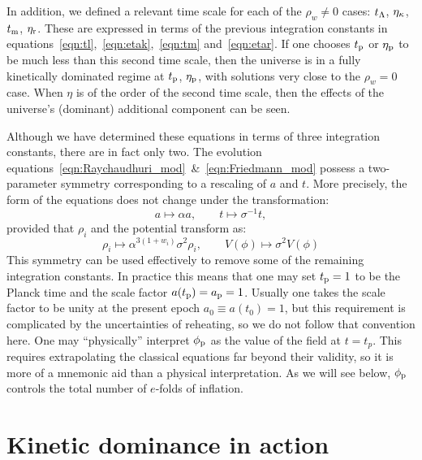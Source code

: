 In addition, we defined a relevant time scale for each of the \(\rho_w \neq 0\) cases: \(t_\mathrm{\Lambda}\), \(\eta_\mathrm{\kappa}\), \(t_{\mathrm{m}}\), \(\eta_{\mathrm{r}}\). These are expressed in terms of the previous integration constants in equations~\eqref{eqn:tl},~\eqref{eqn:etak},~\eqref{eqn:tm} and~\eqref{eqn:etar}. If one chooses \(t_{\mathrm{p}}\) or \(\eta_{\mathrm{p}}\) to be much less than this second time scale, then the universe is in a fully kinetically dominated regime at \(t_{\mathrm{p}}\), \(\eta_{\mathrm{p}}\), with solutions very close to the \(\rho_w=0\) case. When \(\eta\) is of the order of the second time scale, then the effects of the universe's (dominant) additional component can be seen.

Although we have determined these equations in terms of three integration constants, there are in fact only two.  The evolution equations~\eqref{eqn:Raychaudhuri_mod}~\&~\eqref{eqn:Friedmann_mod} possess a two-parameter symmetry corresponding to a rescaling of \(a\) and \(t\). More precisely, the form of the equations does not change under the transformation:
%
\begin{equation}
  a\mapsto\alpha a, 
  \qquad 
  t \mapsto\sigma^{-1}t,
\end{equation}
%
provided that \(\rho_i\) and the potential transform as:
%
\begin{equation}
  \rho_i \mapsto \alpha^{3(1+w_i)}\sigma^2\rho_i, 
  \qquad
  V(\phi) \mapsto \sigma^2 V(\phi)
\end{equation}
%
This symmetry can be used effectively to remove some of the remaining integration constants. In practice this means that one may set \(t_{\mathrm{p}}=1\) to be the Planck time and the scale factor \(a(t_{\mathrm{p}})=a_{\mathrm{p}}=1\). Usually one takes the scale factor to be unity at the present epoch \(a_0\equiv a(t_0)=1\), but this requirement is complicated by the uncertainties of reheating, so we do not follow that convention here. One may ``physically'' interpret \(\phi_{\mathrm{p}}\) as the value of the field at \(t=t_p\).  This requires extrapolating the classical equations far beyond their validity, so it is more of a mnemonic aid than a physical interpretation.  As we will see below, \(\phi_{\mathrm{p}}\) controls the total number of \(e\)-folds of inflation.













\section{Kinetic dominance in action}
\label{sec:Kinetic_dominance_in_action}

